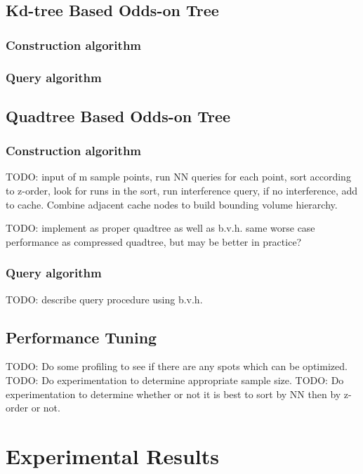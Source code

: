 \documentclass[mcs]{scsthesis}
\begin{document}
\section{Kd-tree Based Odds-on Tree}

\subsection{Construction algorithm}

\subsection{Query algorithm}

\section{Quadtree Based Odds-on Tree}

\subsection{Construction algorithm}

TODO: input of m sample points, run NN queries for each point, sort according
to z-order, look for runs in the sort, run interference query, if no
interference, add to cache.  Combine adjacent cache nodes to build bounding
volume hierarchy.

TODO: implement as proper quadtree as well as b.v.h.  same worse case 
performance as compressed quadtree, but may be better in practice?

\subsection{Query algorithm}

TODO: describe query procedure using b.v.h.

\section{Performance Tuning}

TODO: Do some profiling to see if there are any spots which can be optimized. 
TODO: Do experimentation to determine appropriate sample size.
TODO: Do experimentation to determine whether or not it is best to sort by NN
      then by z-order or not.

\chapter{Experimental Results}
\end{document}
